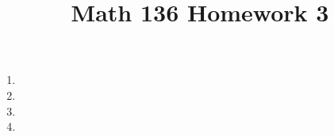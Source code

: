 \documentclass{article}
\title{Math 136 Homework 3}
\begin{document}
    \maketitle
    \begin{enumerate}
      \item 
      \item 
      \item 
      \item 
    \end{enumerate}
\end{document}
